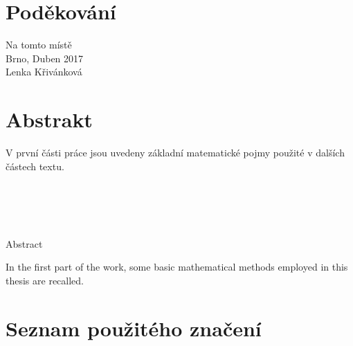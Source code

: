 \documentclass[a4paper,12pt]{report}
\theoremstyle{definition} \newtheorem{definice}[veta]{Definice}
\theoremstyle{remark}
\begin{document}
\chapter*{Poděkování}
\pagestyle{plain}
Na tomto místě
\\

Brno, Duben 2017
\\

Lenka Křivánková

\chapter*{Abstrakt}
V první části práce jsou uvedeny základní matematické pojmy použité v dalších částech textu. 
\\\\\\\\\\

\begin{flushright} {{\Huge Abstract}} \vspace{38pt} \end{flushright}
In the first part of the work, some basic mathematical methods employed in this thesis are recalled. 

\tableofcontents {}

\chapter*{Seznam použitého značení} 
\end{document}
